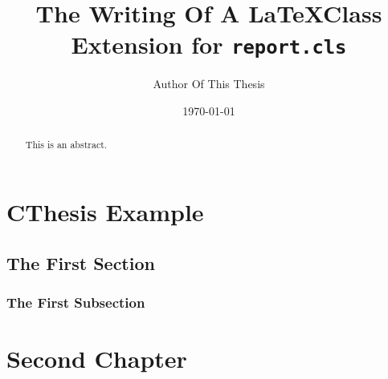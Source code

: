 \documentclass[accent=65a97c]{cthesis}
\begin{document}
\begin{titlepage}

\gap{0cm}
\title{The Writing Of A \LaTeX Class Extension for \texttt{report.cls}}
\author{Author Of This Thesis}
\date{\today}

\vspace*{0cm}%
\maketitle
\end{titlepage}

\newpage\null\thispagestyle{empty}\newpage
{}
\thispagestyle{front}

\begin{abstract}
    This is an abstract. \blindtext
\end{abstract}

\tableofcontents
\cleardoublepage

\pagestyle{main}

    \chapter{CThesis Example}
    \section{The First Section}
    \blindtext
    \subsection{The First Subsection}
    \blindtext
    \blindtext
    \blindtext
    \blindtext
    \blindtext
    \blindtext
    \blindtext
    \blindtext
    \chapter{Second Chapter}
\end{document}
